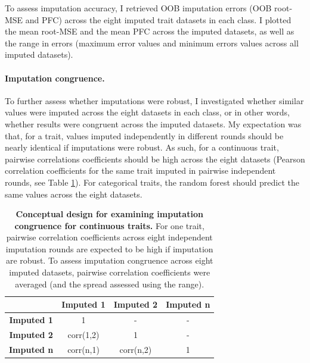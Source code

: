 To assess imputation accuracy, I retrieved OOB imputation errors (OOB root-MSE and PFC) across the eight imputed trait datasets in each class. I plotted the mean root-MSE and the mean PFC across the imputed datasets, as well as the range in errors (maximum error values and minimum errors values across all imputed datasets).

\paragraph{Imputation congruence.} To further assess whether imputations were robust, I investigated whether similar values were imputed across the eight datasets in each class, or in other words, whether results were congruent across the imputed datasets.  My expectation was that, for a trait, values imputed independently in different rounds should be nearly identical if imputations were robust. As such, for a continuous trait, pairwise correlations coefficients should be high across the eight datasets (Pearson correlation coefficients for the same trait imputed in pairwise independent rounds, see Table \ref{pairwisecorr}). For categorical traits, the random forest should predict the same values across the eight datasets. 

\begin{table}[h!]
\renewcommand{\baselinestretch}{1}
\renewcommand{\arraystretch}{1.5}
\begin{center}\fontsize{9}{11}\selectfont
\caption[Conceptual design for examining imputation congruence for continuous traits]{\textbf{Conceptual design for examining imputation congruence for continuous traits.} For one trait, pairwise correlation coefficients across eight independent imputation rounds are expected to be high if imputation are robust. To assess imputation congruence across eight imputed datasets, pairwise correlation coefficients were averaged (and the spread assessed using the range).} 
\label{pairwisecorr}
 \begin{tabular}{c|c|c|c|}
\cline{2-4}
\multicolumn{1}{l|}{}                    & \textbf{Imputed 1} & \textbf{Imputed 2} & \textbf{Imputed n} \\ \hline
\multicolumn{1}{|c|}{\textbf{Imputed 1}} & 1                  & -                  & -                  \\ \hline
\multicolumn{1}{|c|}{\textbf{Imputed 2}} & corr(1,2)          & 1                  & -                  \\ \hline
\multicolumn{1}{|c|}{\textbf{Imputed n}} & corr(n,1)          & corr(n,2)          & 1                  \\ \hline
\end{tabular}
\end{center}
\end{table}


